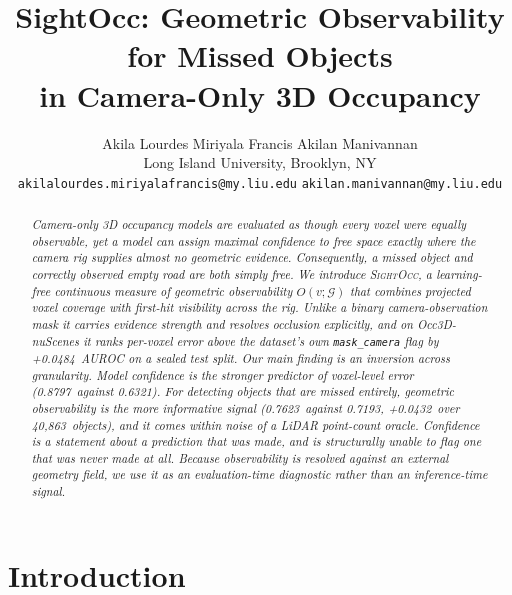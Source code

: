 \documentclass[10pt,twocolumn,letterpaper]{article}
\newcommand{\Hii}{+0.0484}
\newcommand{\objObs}{0.7623}
\newcommand{\objMSP}{0.7193}
\newcommand{\objDelta}{+0.0432}
\newcommand{\voxMSP}{0.8797}
\newcommand{\voxObs}{0.6321}
\newcommand{\nObj}{40{,}863}
\begin{document}
\title{SightOcc: Geometric Observability for Missed Objects\\
       in Camera-Only 3D Occupancy}

\author{%
Akila Lourdes Miriyala Francis \qquad Akilan Manivannan\\
Long Island University, Brooklyn, NY\\
{\tt\small akilalourdes.miriyalafrancis@my.liu.edu}\quad
{\tt\small akilan.manivannan@my.liu.edu}
}

\date{}
\maketitle

\begin{abstract}
\itshape
Camera-only 3D occupancy models are evaluated as though every voxel were
equally observable, yet a model can assign maximal confidence to free
space exactly where the camera rig supplies almost no geometric evidence.
Consequently, a missed object and correctly observed empty road are both
simply \emph{free}. We introduce {\upshape\textsc{SightOcc}}, a learning-free continuous
measure of \emph{geometric observability} $O(v;\mathcal{G})$ that combines
projected voxel coverage with first-hit visibility across the rig. Unlike
a binary camera-observation mask it carries evidence \emph{strength} and
resolves occlusion explicitly, and on Occ3D-nuScenes it ranks per-voxel
error above the dataset's own \texttt{mask\_camera} flag by \Hii\ AUROC on
a sealed test split. Our main finding is an inversion across granularity.
Model confidence is the stronger predictor of voxel-level error
(\voxMSP\ against \voxObs). For detecting objects that are missed
entirely, geometric observability is the more informative signal (\objObs\
against \objMSP, \objDelta\ over \nObj\ objects), and it comes within
noise of a LiDAR point-count oracle. Confidence is a statement about a
prediction that was made, and is structurally unable to flag one that was
never made at all. Because observability is resolved against an external
geometry field, we use it as an evaluation-time diagnostic rather than an
inference-time signal.
\end{abstract}

\section{Introduction}
\end{document}

